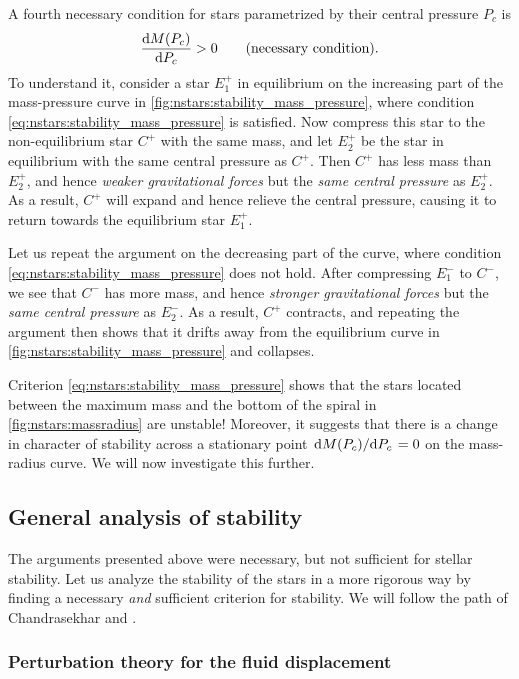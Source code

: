 A fourth necessary condition for stars parametrized by their central pressure $P_c$ is
\begin{equation}
	\odv{M(P_c)}{P_c} > 0
	\qquad \text{(necessary condition)} .
\label{eq:nstars:stability_mass_pressure}
\end{equation}
To understand it, consider a star $E_1^+$ in equilibrium on the increasing part of the mass-pressure curve in \cref{fig:nstars:stability_mass_pressure}, where condition \eqref{eq:nstars:stability_mass_pressure} is satisfied.
Now compress this star to the non-equilibrium star $C^+$ with the same mass, and let $E_2^+$ be the star in equilibrium with the same central pressure as $C^+$.
Then $C^+$ has less mass than $E_2^+$, and hence \emph{weaker gravitational forces} but the \emph{same central pressure} as $E_2^+$.
As a result, $C^+$ will expand and hence relieve the central pressure, causing it to return towards the equilibrium star $E_1^+$.

Let us repeat the argument on the decreasing part of the curve, where condition \eqref{eq:nstars:stability_mass_pressure} does not hold.
After compressing $E_1^-$ to $C^-$, we see that $C^-$ has more mass, and hence \emph{stronger gravitational forces} but the \emph{same central pressure} as $E_2^-$.
As a result, $C^+$ contracts, and repeating the argument then shows that it drifts away from the equilibrium curve in \cref{fig:nstars:stability_mass_pressure} and collapses.

Criterion \eqref{eq:nstars:stability_mass_pressure} shows that the stars located between the maximum mass and the bottom of the spiral in \cref{fig:nstars:massradius} are unstable!
Moreover, it suggests that there is a change in character of stability across a stationary point $\odv{M(P_c)}/{P_c} = 0$ on the mass-radius curve.
We will now investigate this further.

\subsection{General analysis of stability}
\label{sec:nstars:stability_general}

The arguments presented above were necessary, but not sufficient for stellar stability.
Let us analyze the stability of the stars in a more rigorous way by finding a necessary \emph{and} sufficient criterion for stability.
We will follow the path of Chandrasekhar \cite{ref:chandrasekhar_stability} and \cite[§26]{ref:mtw}.

\subsubsection{Perturbation theory for the fluid displacement}

